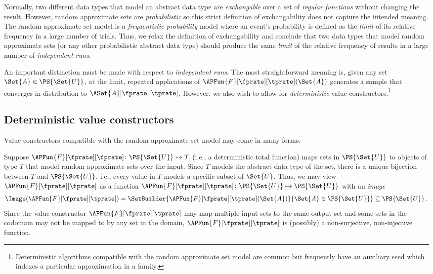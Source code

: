 \documentclass[ ../main.tex]{subfiles}
\newcommand{\ctor}[2]{\APFun{F}[#1][#2]}
\begin{document}
Normally, two different data types that model an abstract data type are \emph{exchangable} over a set of \emph{regular functions} without changing the result.
However, random approximate sets are \emph{probabilistic} so this strict definition of exchangability does not capture the intended meaning.
The random approximate set model is a \emph{frequentistic probability} model where an event's probability is defined as the \emph{limit} of its relative frequency in a large number of trials.
Thus, we relax the definition of exchangability and conclude that two data types that model random approximate sets (or any other probabilistic abstract data type) should produce the same \emph{limit} of the relative frequency of results in a large number of \emph{independent runs}.

An important distinction must be made with respect to \emph{independent runs}.
The most straightforward meaning is, given any set $\Set{A} \in \PS{\Set{U}}$, at the limit, repeated applications of $\ctor{\fprate}{\tprate}(\Set{A})$ generates a sample that converges in distribution to $\ASet{A}[\fprate][\tprate]$.
However, we also wish to allow for \emph{deterministic} value constructors.\footnote{Deterministic algorithms compatible with the random approximate set model are common but frequently have an auxiliary seed which indexes a particular approximation in a family.}

\subsection{Deterministic value constructors}
Value constructors compatible with the random approximate set model may come in many forms.


Suppose $\ctor{\fprate}{\fprate} \colon \PS{\Set{U}} \mapsto T$ (i.e., a deterministic total function) maps sets in $\PS{\Set{U}}$ to objects of type $T$ that model random approximate sets over the input.
Since $T$ models the abstract data type of the set, there is a unique bijection between $T$ and $\PS{\Set{{U}}}$, i.e., every value in $T$ models a specific subset of $\Set{U}$.
Thus, we may view $\ctor{\fprate}{\fprate}$ as a function $\ctor{\fprate}{\tprate} \colon \PS{\Set{U}} \mapsto \PS{\Set{U}}$ with an \emph{image}
\begin{equation}
\Image(\ctor{\fprate}{\tprate}) = \SetBuilder{\ctor{\fprate}{\tprate}(\Set{A})}{\Set{A} \in \PS{\Set{U}}} \subseteq \PS{\Set{U}}\,.
\end{equation}
Since the value constructor $\ctor{\fprate}{\tprate}$ may map multiple input sets to the same output set and some sets in the codomain may not be mapped to by any set in the domain, $\ctor{\fprate}{\tprate}$ is (possibly) a non-surjective, non-injective function.
\end{document}
